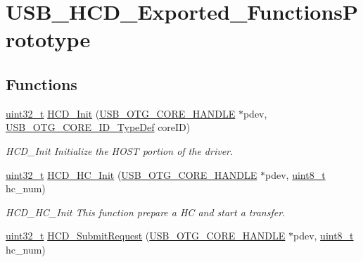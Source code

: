 \hypertarget{group___u_s_b___h_c_d___exported___functions_prototype}{\section{U\-S\-B\-\_\-\-H\-C\-D\-\_\-\-Exported\-\_\-\-Functions\-Prototype}
\label{group___u_s_b___h_c_d___exported___functions_prototype}
}
\subsection*{Functions}
\begin{DoxyCompactItemize}
\item 
\hyperlink{stdint_8h_a435d1572bf3f880d55459d9805097f62}{uint32\-\_\-t} \hyperlink{group___u_s_b___h_c_d___exported___functions_prototype_gaf8e5fe138e7ddcece159c1c741f5b9d2}{H\-C\-D\-\_\-\-Init} (\hyperlink{group___u_s_b___c_o_r_e___exported___types_gaf76054c11eb8a3367907aad7ae700e80}{U\-S\-B\-\_\-\-O\-T\-G\-\_\-\-C\-O\-R\-E\-\_\-\-H\-A\-N\-D\-L\-E} $\ast$pdev, \hyperlink{group___u_s_b___d_e_f_i_n_e_s___exported___types_gab31b9dd0bc08bf6120424c20bda8eb7e}{U\-S\-B\-\_\-\-O\-T\-G\-\_\-\-C\-O\-R\-E\-\_\-\-I\-D\-\_\-\-Type\-Def} core\-I\-D)
\begin{DoxyCompactList}\small\item\em H\-C\-D\-\_\-\-Init Initialize the H\-O\-S\-T portion of the driver. \end{DoxyCompactList}\item 
\hyperlink{stdint_8h_a435d1572bf3f880d55459d9805097f62}{uint32\-\_\-t} \hyperlink{group___u_s_b___h_c_d___exported___functions_prototype_ga1e1685e970b86a17b7b31ab9a14ad1c2}{H\-C\-D\-\_\-\-H\-C\-\_\-\-Init} (\hyperlink{group___u_s_b___c_o_r_e___exported___types_gaf76054c11eb8a3367907aad7ae700e80}{U\-S\-B\-\_\-\-O\-T\-G\-\_\-\-C\-O\-R\-E\-\_\-\-H\-A\-N\-D\-L\-E} $\ast$pdev, \hyperlink{stdint_8h_aba7bc1797add20fe3efdf37ced1182c5}{uint8\-\_\-t} hc\-\_\-num)
\begin{DoxyCompactList}\small\item\em H\-C\-D\-\_\-\-H\-C\-\_\-\-Init This function prepare a H\-C and start a transfer. \end{DoxyCompactList}\item 
\hyperlink{stdint_8h_a435d1572bf3f880d55459d9805097f62}{uint32\-\_\-t} \hyperlink{group___u_s_b___h_c_d___exported___functions_prototype_gad07e6e0a136a94695425c6663d7ce5f2}{H\-C\-D\-\_\-\-Submit\-Request} (\hyperlink{group___u_s_b___c_o_r_e___exported___types_gaf76054c11eb8a3367907aad7ae700e80}{U\-S\-B\-\_\-\-O\-T\-G\-\_\-\-C\-O\-R\-E\-\_\-\-H\-A\-N\-D\-L\-E} $\ast$pdev, \hyperlink{stdint_8h_aba7bc1797add20fe3efdf37ced1182c5}{uint8\-\_\-t} hc\-\_\-num)

\end{DoxyCompactItemize}
